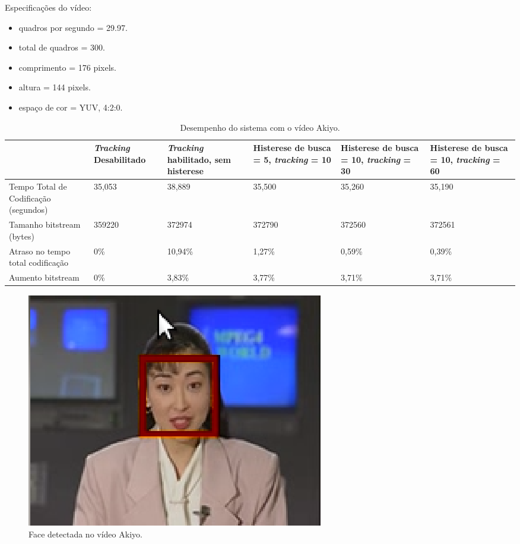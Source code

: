 Especificações do vídeo:

\begin{itemize}
        \item quadros por segundo = 29.97.
        \item total de quadros    = 300.
        \item comprimento         = 176 pixels.
        \item altura              = 144 pixels.
        \item espaço de cor       = YUV, 4:2:0.
\end{itemize}


\begin{table}[H]
\begin{center}
\begin{tabular}{|p{2.3cm}|p{2.3cm}|p{2.3cm}|p{2.3cm}|p{2.3cm}|p{2.3cm}|}
\hline
\textbf{} & \textbf{\textit{Tracking} Desabilitado} & \textbf{\textit{Tracking} habilitado, sem histerese} & \textbf{Histerese de busca = 5, \textit{tracking} = 10} & \textbf{Histerese de busca = 10, \textit{tracking} = 30} & \textbf{Histerese de busca = 10, \textit{tracking} = 60} \\
\hline
Tempo Total de Codificação (segundos) & 35,053 & 38,889 & 35,500 & 35,260 & 35,190 \\
\hline
Tamanho bitstream (bytes) & 359220 & 372974 & 372790 & 372560 & 372561 \\
\hline
Atraso no tempo total codificação & 0\% & 10,94\% & 1,27\% & 0,59\% & 0,39\% \\
\hline
Aumento bitstream  & 0\% & 3,83\% & 3,77\% & 3,71\% & 3,71\% \\
\hline
\end{tabular}
\caption{Desempenho do sistema com o vídeo Akiyo.}
\label{tab:space_overhead}
\end{center}
\end{table}

\begin{figure}[H]
\centering
\includegraphics[scale=0.8]{imagens/fig20.eps}
\caption{Face detectada no vídeo Akiyo.}
\label{fig:akiyo_example}
\end{figure}

